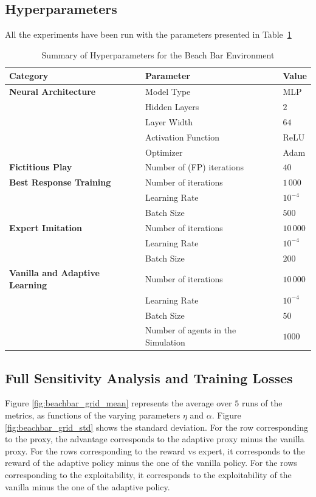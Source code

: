 \documentclass{article}
\theoremstyle{plain}
\begin{document}
\subsection{Hyperparameters}
All the experiments have been run with the parameters presented in Table~\ref{tab:beachbar_hyperparameters}
\begin{table}[htbp]
\centering
\caption{Summary of Hyperparameters for the Beach Bar Environment}
\label{tab:beachbar_hyperparameters}
\begin{tabular}{@{}lll@{}}
\toprule
\textbf{Category} & \textbf{Parameter} & \textbf{Value} \\ \midrule
\textbf{Neural Architecture} & Model Type & MLP \\
& Hidden Layers & $2$ \\
& Layer Width & $64$ \\
& Activation Function & ReLU \\
& Optimizer & Adam \\ \addlinespace
\textbf{Fictitious Play} & Number of (FP) iterations & $40$ \\ \addlinespace
\textbf{Best Response Training} & Number of iterations & $1\,000$ \\
& Learning Rate & $10^{-4}$ \\
& Batch Size  & $500$ \\ \addlinespace
\textbf{Expert Imitation} & Number of iterations & $10\,000$ \\
& Learning Rate & $10^{-4}$ \\
& Batch Size & $200$ \\ \addlinespace
\textbf{Vanilla and Adaptive Learning} & Number of iterations & $10\,000$ \\
& Learning Rate & $10^{-4}$ \\
& Batch Size & $50$ \\ 
& Number of agents in the Simulation & $1000$ \\ 
\bottomrule
\end{tabular}
\end{table}

\subsection{Full Sensitivity Analysis and Training Losses}
Figure \ref{fig:beachbar_grid_mean} represents the average over $5$ runs of the metrics, as functions of the varying parameters $\eta$ and $\alpha$. Figure \ref{fig:beachbar_grid_std} shows the standard deviation. For the row corresponding to the proxy, the advantage corresponds to the adaptive proxy minus the vanilla proxy. For the rows corresponding to the reward vs expert, it corresponds to the reward of the adaptive policy minus the one of the vanilla policy. For the rows corresponding to the exploitability, it corresponds to the exploitability of the vanilla minus the one of the adaptive policy.
\end{document}
